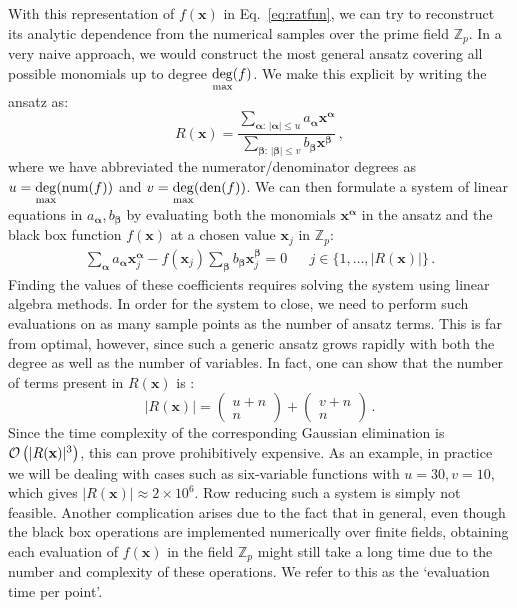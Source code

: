 \documentclass[main.tex]{subfiles}
\begin{document}
With this representation of $f(\mathbf{x})$ in Eq.~\ref{eq:ratfun}, we can try to reconstruct its analytic dependence from the numerical samples over the prime field $\mathbb{Z}_p$. In a very naive approach, we would construct the most general ansatz covering all possible monomials up to degree $\underset{\text{max}}{\deg} (f)$. We make this explicit by writing the ansatz as:
\begin{equation}
    R(\mathbf{x}) = \frac{
    \sum\limits_{\bm{\alpha}:\, |\bm{\alpha}| \le u} a_{\bm{\alpha}} \mathbf{x}^{\bm{\alpha}}
    }{
    \sum\limits_{\bm{\beta}:\, |\bm{\beta}| \le v} b_{\bm{\beta}} \mathbf{x}^{\bm{\beta}}
    }\,,
\end{equation}
where we have abbreviated the numerator/denominator degrees as $u=\underset{\text{max}}{\deg}(\text{num}(f))$ and $v=\underset{\text{max}}{\deg}(\text{den}(f))$. We can then formulate a system of linear equations in $a_{\bm{\alpha}}, b_{\bm{\beta}}$ by evaluating both the monomials $\mathbf{x}^{\bm{\alpha}}$ in the ansatz and the black box function $f(\mathbf{x})$ at a chosen value $\mathbf{x}_j$ in $\mathbb{Z}_p$:
\begin{align}
    \sum_{\bm{\alpha}} a_{\bm{\alpha}} \mathbf{x}_j^{\bm{\alpha}} - 
    f(\mathbf{x}_j) \sum_{\bm{\beta}} b_{\bm{\beta}} \mathbf{x}_j^{\bm{\beta}} = 0 
&&    
j \in \{1, \ldots, |R(\mathbf{x})|\} \,.
\end{align}
Finding the values of these coefficients requires solving the system using linear algebra methods. In order for the system to close, we need to perform such evaluations on as many sample points as the number of ansatz terms. This is far from optimal, however, since such a generic ansatz grows rapidly with both the degree as well as the number of variables. In fact, one can show that the number of terms present in $R(\mathbf{x})$ is \cite{benpageSAGEX}:
\begin{equation} \label{eq:naiveansatzlength}
    |R(\mathbf{x})| = 
    \begin{pmatrix}
        u + n \\
        n
    \end{pmatrix}
    +
    \begin{pmatrix}
        v + n \\
        n
    \end{pmatrix}\,.
\end{equation}
Since the time complexity of the corresponding Gaussian elimination is $\mathcal{O}\left(|R(\mathbf{x})|^3\right)$, this can prove prohibitively expensive. As an example, in practice we will be dealing with cases such as six-variable functions with $u=30, v=10$, which gives $|R(\mathbf{x})| \approx 2\times 10^6$. Row reducing such a system is simply not feasible. Another complication arises due to the fact that in general, even though the black box operations are implemented numerically over finite fields, obtaining each evaluation of $f(\mathbf{x})$ in the field $\mathbb{Z}_p$ might still take a long time due to the number and complexity of these operations. We refer to this as the `evaluation time per point'.
\end{document}
